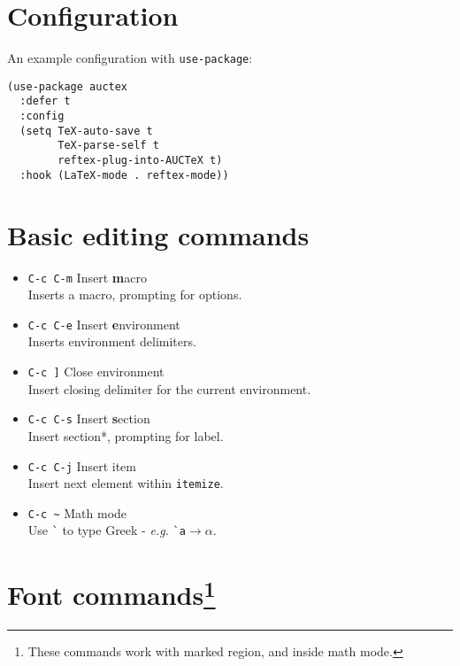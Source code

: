 \documentclass[landscape]{article}
\newcommand{\kbd}[1]{\colorbox{gray!10!}{\texttt{#1}}\hspace{5mm}}
\newcommand{\doctitle}{\texttt{AUC}\TeX \hspace{.25em} Cheatsheet}
\begin{document}
\hspace*{\fill}{\huge \bfseries \doctitle \hspace*{\fill}}
\vspace{2em}
  
\begin{multicols}{3}

\section*{Configuration}

An example configuration with \texttt{use-package}:
  
\begin{Verbatim}
(use-package auctex
  :defer t
  :config
  (setq TeX-auto-save t
        TeX-parse-self t
        reftex-plug-into-AUCTeX t)
  :hook (LaTeX-mode . reftex-mode))
\end{Verbatim}

\section*{Basic editing commands}

\begin{itemize}
\item \kbd{C-c C-m} Insert \textbf{m}acro \\
  Inserts a macro, prompting for options.
\item \kbd{C-c C-e} Insert \textbf{e}nvironment \\
  Inserts environment delimiters.
\item \kbd{C-c ]} Close environment \\
  Insert closing delimiter for the current environment.
\item \kbd{C-c C-s} Insert \textbf{s}ection \\
  Insert section*, prompting for label.
\item \kbd{C-c C-j} Insert item \\
  Insert next element within \texttt{itemize}.
\item \kbd{C-c \~} Math mode \\
  Use \texttt{\`} to type Greek - \textit{e.g.} \texttt{\`}\texttt{a}$\rightarrow\alpha$.
\end{itemize}


\section*{Font commands\footnote{ These commands work with marked region, and inside math mode.}}
\label{sec:font-commands}


\end{multicols}
\end{document}
